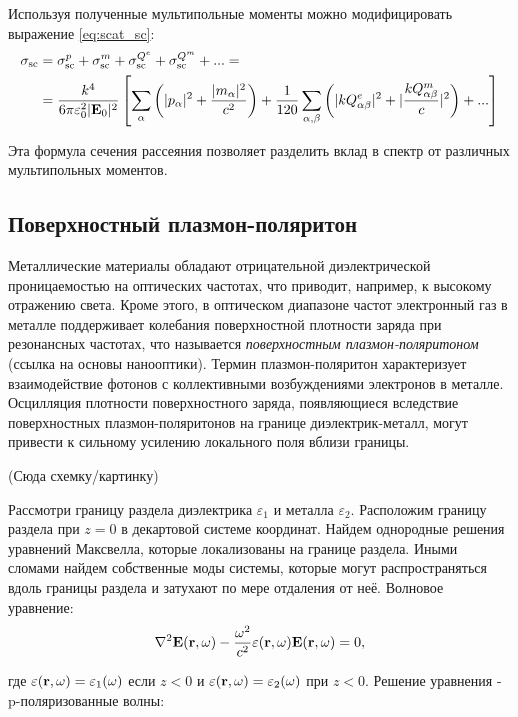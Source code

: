 Используя полученные мультипольные моменты можно модифицировать выражение \eqref{eq:scat_sc}:
\begin{align*}
    \sigma_{\text{sc}} &= \sigma_{\text{sc}}^p + \sigma_{\text{sc}}^m + \sigma_{\text{sc}}^{Q^e} +
    \sigma_{\text{sc}}^{Q^m} + ... = \\ &= \frac{k^4}{6 \pi \varepsilon_0^2 |\vb{E}_0|^2 } \left[ \sum_{\alpha}\left( |p_{\alpha}|^2 + 
    \frac{| m_{\alpha}|^2}{c^2} \right) + \frac{1}{120} \sum_{\alpha,\beta} \left( |k Q_{\alpha \beta}^e|^2 + |\frac{k Q_{\alpha \beta}^m}{c}|^2 \right) + ...\right]
\end{align*}

Эта формула сечения рассеяния позволяет разделить вклад в спектр от различных мультипольных моментов. 

\subsection{Поверхностный плазмон-поляритон}\label{subsec:spp}

Металлические материалы обладают отрицательной диэлектрической проницаемостью на оптических частотах, что приводит, например, к высокому отражению света. Кроме этого, в оптическом диапазоне частот электронный газ в металле поддерживает колебания поверхностной плотности заряда при резонансных частотах, что называется \textit {поверхностным плазмон-поляритоном} (ссылка на основы нанооптики). Термин плазмон-поляритон характеризует взаимодействие фотонов с коллективными возбуждениями электронов в металле. Осцилляция плотности поверхностного заряда, появляющиеся вследствие поверхностных плазмон-поляритонов на границе  диэлектрик-металл, могут привести к сильному усилению локального поля вблизи границы. 

(Сюда схемку/картинку)

Рассмотри границу раздела диэлектрика $\varepsilon_1$ и металла $\varepsilon_2$. Расположим границу раздела при $z=0$ в декартовой системе координат. Найдем однородные решения уравнений Максвелла, которые локализованы на границе раздела.  Иными сломами найдем собственные моды системы, которые могут распространяться вдоль границы раздела и затухают по мере отдаления от неё. Волновое уравнение:
\begin{equation}
    \nabla^2 \vb{E}(\vb{r}, \omega) - \frac{\omega^2}{c^2} \varepsilon(\vb{r}, \omega) \vb{E}(\vb{r}, \omega) = 0, \label{eq;wave_eq_spp}
\end{equation}

где $\varepsilon(\vb{r}, \omega) = \varepsilon_1 (\omega)$ если $z<0$ и $\varepsilon(\vb{r}, \omega) = \varepsilon_2 (\omega) $ при $z<0$. 
Решение уравнения - p-поляризованные волны:

